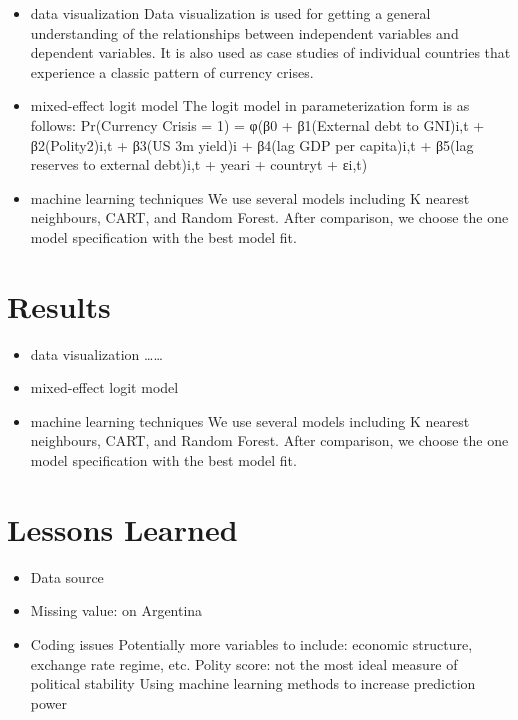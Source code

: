 \documentclass[12pt,]{article}
\providecommand{\tightlist}{%
  \setlength{\itemsep}{0pt}\setlength{\parskip}{0pt}}
\begin{document}
\begin{itemize}
\tightlist
\item
  data visualization Data visualization is used for getting a general
  understanding of the relationships between independent variables and
  dependent variables. It is also used as case studies of individual
  countries that experience a classic pattern of currency crises.
\item
  mixed-effect logit model The logit model in parameterization form is
  as follows: Pr(Currency Crisis = 1) = φ(β0 + β1(External debt to
  GNI)i,t + β2(Polity2)i,t + β3(US 3m yield)i + β4(lag GDP per
  capita)i,t + β5(lag reserves to external debt)i,t + yeari + countryt +
  εi,t)
\item
  machine learning techniques We use several models including K nearest
  neighbours, CART, and Random Forest. After comparison, we choose the
  one model specification with the best model fit.
\end{itemize}

\section{Results}

\begin{itemize}
\tightlist
\item
  data visualization \ldots{}\ldots{}
\item
  mixed-effect logit model
\item
  machine learning techniques We use several models including K nearest
  neighbours, CART, and Random Forest. After comparison, we choose the
  one model specification with the best model fit.
\end{itemize}

\section{Lessons Learned}

\begin{itemize}
\tightlist
\item
  Data source
\item
  Missing value: on Argentina
\item
  Coding issues Potentially more variables to include: economic
  structure, exchange rate regime, etc. Polity score: not the most ideal
  measure of political stability Using machine learning methods to
  increase prediction power
\end{itemize}
\end{document}
